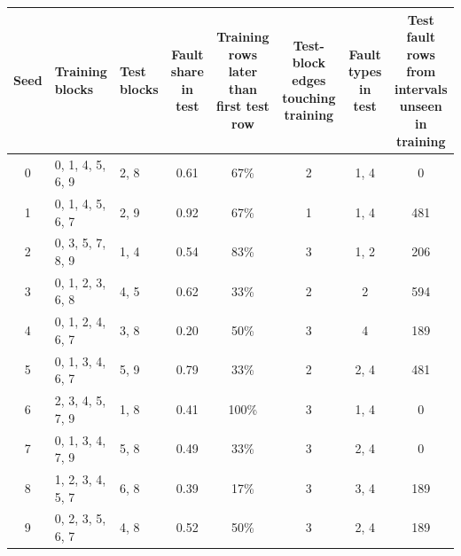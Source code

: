\begin{tabular}{cllccccc}
\toprule
Seed & Training blocks & Test blocks & Fault share in test & Training rows later than first test row & Test-block edges touching training & Fault types in test & Test fault rows from intervals unseen in training \\
\midrule
0 & 0, 1, 4, 5, 6, 9 & 2, 8 & 0.61 & 67\% & 2 & 1, 4 & 0 \\
1 & 0, 1, 4, 5, 6, 7 & 2, 9 & 0.92 & 67\% & 1 & 1, 4 & 481 \\
2 & 0, 3, 5, 7, 8, 9 & 1, 4 & 0.54 & 83\% & 3 & 1, 2 & 206 \\
3 & 0, 1, 2, 3, 6, 8 & 4, 5 & 0.62 & 33\% & 2 & 2 & 594 \\
4 & 0, 1, 2, 4, 6, 7 & 3, 8 & 0.20 & 50\% & 3 & 4 & 189 \\
5 & 0, 1, 3, 4, 6, 7 & 5, 9 & 0.79 & 33\% & 2 & 2, 4 & 481 \\
6 & 2, 3, 4, 5, 7, 9 & 1, 8 & 0.41 & 100\% & 3 & 1, 4 & 0 \\
7 & 0, 1, 3, 4, 7, 9 & 5, 8 & 0.49 & 33\% & 3 & 2, 4 & 0 \\
8 & 1, 2, 3, 4, 5, 7 & 6, 8 & 0.39 & 17\% & 3 & 3, 4 & 189 \\
9 & 0, 2, 3, 5, 6, 7 & 4, 8 & 0.52 & 50\% & 3 & 2, 4 & 189 \\
\bottomrule
\end{tabular}
